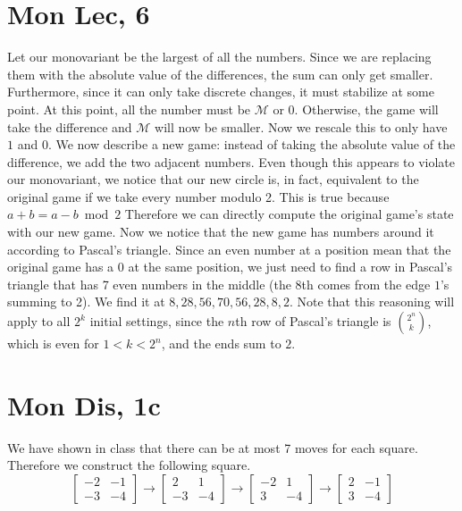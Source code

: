 \documentclass[12pt]{article}
\newcommand{\M}{\mathcal{M}}
\begin{document}
\section{Mon Lec, 6}
Let our monovariant be the largest of all the numbers. Since we are replacing them with the absolute value of the differences, the sum can only get smaller. Furthermore, since it can only take discrete changes, it must stabilize at some point.
\newline
At this point, all the number must be $\M$ or 0. Otherwise, the game will take the difference and $\M$ will now be smaller. Now we rescale this to only have $1$ and $0$.
\newline
We now describe a new game: instead of taking the absolute value of the difference, we add the two adjacent numbers. Even though this appears to violate our monovariant, we notice that our new circle is, in fact, equivalent to the original game if we take every number modulo 2. This is true because $a+b = a-b \bmod 2$ Therefore we can directly compute the original game's state with our new game.
\newline
Now we notice that the new game has numbers around it according to Pascal's triangle. Since an even number at a position mean that the original game has a $0$ at the same position, we just need to find a row in Pascal's triangle that has 7 even numbers in the middle (the 8th comes from the edge $1$'s summing to 2). We find it at $8, 28,56,70,56,28,8,2$.
\newline
Note that this reasoning will apply to all $2^k$ initial settings, since the $n$th row of Pascal's triangle is $\binom{2^n}{k}$, which is even for $1<k<2^n$, and the ends sum to $2$.
\newpage


\section{Mon Dis, 1c}
We have shown in class that there can be at most 7 moves for each square. Therefore we construct the following square.
$$
\begin{bmatrix}
-2 & -1\\
-3 & -4
\end{bmatrix}
\to
\begin{bmatrix}
2 & 1\\
-3 & -4
\end{bmatrix}
\to
\begin{bmatrix}
-2 & 1\\
3 & -4
\end{bmatrix}
\to
\begin{bmatrix}
2 & -1\\
3 & -4
\end{bmatrix}
$$
\end{document}
